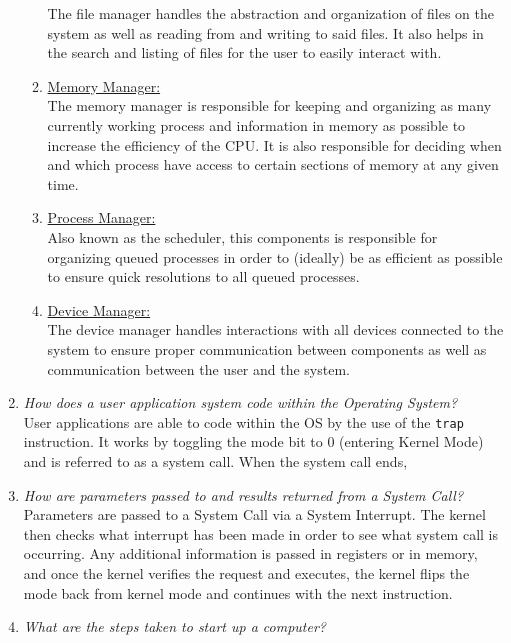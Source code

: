 \documentclass[12pt]{article}
\begin{document}
\begin{enumerate}
\begin{enumerate}
			The file manager handles the abstraction and organization of files on the system as well as reading from and writing to said files. It also helps in the search and listing of files for the user to easily interact with.
			\item \underline{Memory Manager:} \\
			The memory manager is responsible for keeping and organizing as many currently working process and information in memory as possible to increase the efficiency of the CPU. It is also responsible for deciding when and which process have access to certain sections of memory at any given time.
			\item \underline{Process Manager:} \\
			Also known as the scheduler, this components is responsible for organizing queued processes in order to (ideally) be as efficient as possible to ensure quick resolutions to all queued processes. 
			\item \underline{Device Manager:} \\
			The device manager handles interactions with all devices connected to the system to ensure proper communication between components as well as communication between the user and the system.
		\end{enumerate}
	\item \textit{How does a user application system code within the Operating System?}\\
	User applications are able to code within the OS by the use of the \verb|trap| instruction. It works by toggling the mode bit to $0$ (entering Kernel Mode) and is referred to as a system call. When the system call ends,
	\item \textit{How are parameters passed to and results returned from a System Call?}\\
	Parameters are passed to a System Call via a System Interrupt. The kernel then checks what interrupt has been made in order to see what system call is occurring. Any additional information is passed in registers or in memory, and once the kernel verifies the request and executes, the kernel flips the mode back from kernel mode and continues with the next instruction.
	\item \textit{What are the steps taken to start up a computer?}\\

\end{enumerate}
\end{document}
